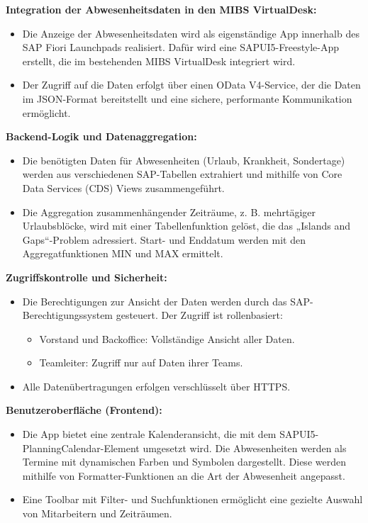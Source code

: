 \textbf{Integration der Abwesenheitsdaten in den MIBS VirtualDesk:}
\begin{itemize}
    \item Die Anzeige der Abwesenheitsdaten wird als eigenständige App innerhalb des SAP Fiori Launchpads realisiert. Dafür wird eine SAPUI5-Freestyle-App erstellt, die im bestehenden MIBS VirtualDesk integriert wird.
    \item Der Zugriff auf die Daten erfolgt über einen OData V4-Service, der die Daten im JSON-Format bereitstellt und eine sichere, performante Kommunikation ermöglicht.
\end{itemize}
\textbf{Backend-Logik und Datenaggregation:}
\begin{itemize}
    \item Die benötigten Daten für Abwesenheiten (Urlaub, Krankheit, Sondertage) werden aus verschiedenen SAP-Tabellen extrahiert und mithilfe von Core Data Services (CDS) Views zusammengeführt.
    \item Die Aggregation zusammenhängender Zeiträume, z. B. mehrtägiger Urlaubsblöcke, wird mit einer Tabellenfunktion gelöst, die das „Islands and Gaps“-Problem adressiert. Start- und Enddatum werden mit den Aggregatfunktionen MIN und MAX ermittelt.
\end{itemize}
\textbf{Zugriffskontrolle und Sicherheit:}
\begin{itemize}
    \item Die Berechtigungen zur Ansicht der Daten werden durch das SAP-Berechtigungssystem gesteuert. Der Zugriff ist rollenbasiert:
    \begin{itemize}
        \item Vorstand und Backoffice: Vollständige Ansicht aller Daten.
        \item Teamleiter: Zugriff nur auf Daten ihrer Teams.
    \end{itemize}
    \item Alle Datenübertragungen erfolgen verschlüsselt über HTTPS.
\end{itemize}
\textbf{Benutzeroberfläche (Frontend):}
\begin{itemize}
    \item Die App bietet eine zentrale Kalenderansicht, die mit dem SAPUI5-PlanningCalendar-Element umgesetzt wird. Die Abwesenheiten werden als Termine mit dynamischen Farben und Symbolen dargestellt. Diese werden mithilfe von Formatter-Funktionen an die Art der Abwesenheit angepasst.
    \item Eine Toolbar mit Filter- und Suchfunktionen ermöglicht eine gezielte Auswahl von Mitarbeitern und Zeiträumen.
\end{itemize}
